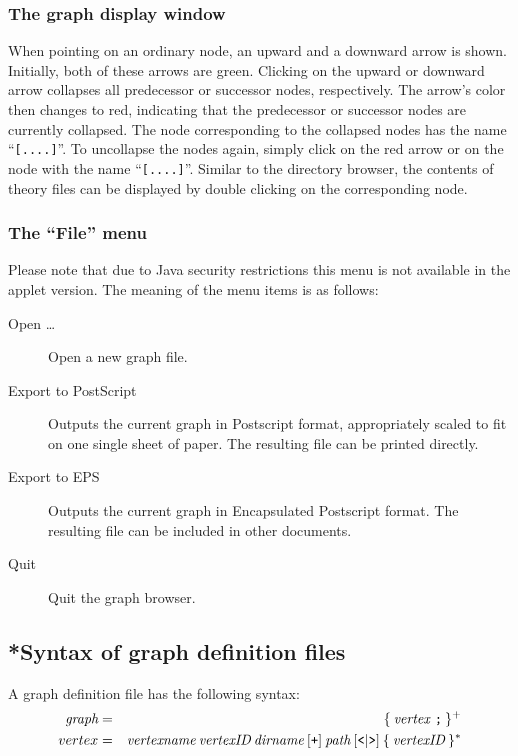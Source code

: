 \subsubsection*{The graph display window}

When pointing on an ordinary node, an upward and a downward arrow is
shown.  Initially, both of these arrows are green. Clicking on the
upward or downward arrow collapses all predecessor or successor nodes,
respectively. The arrow's color then changes to red, indicating that
the predecessor or successor nodes are currently collapsed. The node
corresponding to the collapsed nodes has the name ``{\tt [....]}''. To
uncollapse the nodes again, simply click on the red arrow or on the
node with the name ``{\tt [....]}''. Similar to the directory browser,
the contents of theory files can be displayed by double clicking on
the corresponding node.


\subsubsection*{The ``File'' menu}

Please note that due to Java security restrictions this menu is not
available in the applet version. The meaning of the menu items is as
follows:
\begin{description}
  
\item[Open \dots] Open a new graph file.
  
\item[Export to PostScript] Outputs the current graph in Postscript format,
  appropriately scaled to fit on one single sheet of paper.  The resulting
  file can be printed directly.
  
\item[Export to EPS] Outputs the current graph in Encapsulated Postscript
  format. The resulting file can be included in other documents.

\item[Quit] Quit the graph browser.

\end{description}


\subsection*{*Syntax of graph definition files}

A graph definition file has the following syntax:
\begin{eqnarray*}
  \mbox{\it graph} & = & \{ \: \mbox{\it vertex \tt ;} \: \} ^ + \\
  vertex & = & \mbox{\it vertexname} \: \mbox{\it vertexID} \: \mbox{\it dirname} \: [ \mbox{\tt +} ]
  \: \mbox{\it path} \: [ \mbox{\tt <} | \mbox{\tt >} ] \: \{ \: \mbox{\it vertexID} \: \} ^ *
\end{eqnarray*}

